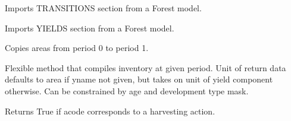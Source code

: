 \documentclass[letterpaper,10pt,english]{sphinxmanual}
\begin{document}
\begin{fulllineitems}
\begin{fulllineitems}
\end{fulllineitems}


\begin{fulllineitems}
\label{\detokenize{forest:forest.ForestModel.import_transitions_section}}
Imports TRANSITIONS section from a Forest model.

\end{fulllineitems}


\begin{fulllineitems}
\label{\detokenize{forest:forest.ForestModel.import_yields_section}}
Imports YIELDS section from a Forest model.

\end{fulllineitems}


\begin{fulllineitems}
\label{\detokenize{forest:forest.ForestModel.initialize_areas}}
Copies areas from period 0 to period 1.

\end{fulllineitems}


\begin{fulllineitems}
\label{\detokenize{forest:forest.ForestModel.inventory}}
Flexible method that compiles inventory at given period.
Unit of return data defaults to area if yname not given, 
but takes on unit of yield component otherwise. 
Can be constrained by age and development type mask.

\end{fulllineitems}


\begin{fulllineitems}
\label{\detokenize{forest:forest.ForestModel.is_harvest}}
Returns True if acode corresponds to a harvesting action.


\end{fulllineitems}
\end{fulllineitems}
\end{document}
